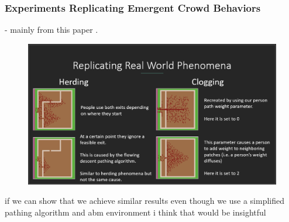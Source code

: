 \documentclass[12pt,letterpaper]{article}
\begin{document}
\subsubsection{Experiments Replicating Emergent Crowd Behaviors}
- mainly from this paper \cite{almeidaCrowdSimulationModeling2013}  .  

\begin{figure}
  \includegraphics[width=\linewidth]{./figures/herding_clogging.png}
  \caption{}
\end{figure}


if we can show that we achieve similar results even though we use a simplified pathing algorithm and abm environment i think that would be insightful
\end{document}
